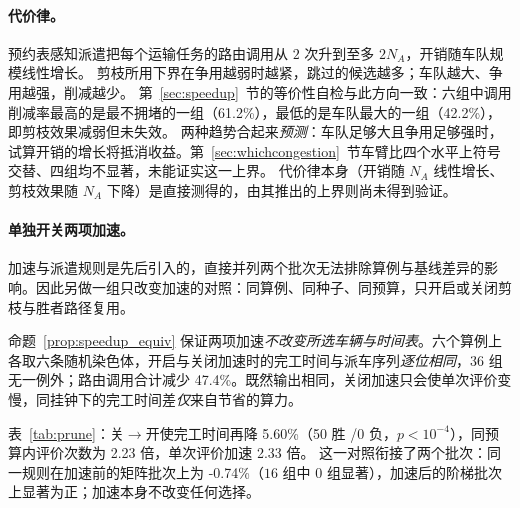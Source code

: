 \documentclass[manuscript,screen,review]{acmart}
\newcommand{\RouteCallCutLo}{42.2\%}     %
\newcommand{\RouteCallCutHi}{61.2\%}     %
\newcommand{\SpeedupProbe}{2.33}
\newcommand{\RouteCallCut}{47.4\%}
\newcommand{\GainPrune}{5.60\%}
\newcommand{\PPrune}{<10^{-4}}
\newcommand{\WinPrune}{50}
\newcommand{\LosePrune}{0}
\newcommand{\EvalRatioPrune}{2.23}
\newcommand{\MatrixCells}{16}
\newcommand{\GainProbePre}{-0.74\%}      %
\begin{document}
\paragraph{代价律。}
预约表感知派遣把每个运输任务的路由调用从 $2$ 次升到至多 $2N_A$，开销随车队规模线性增长。
剪枝所用下界在争用越弱时越紧，跳过的候选越多；车队越大、争用越强，削减越少。
第~\ref{sec:speedup}~节的等价性自检与此方向一致：六组中调用削减率最高的是最不拥堵的一组（\RouteCallCutHi{}），最低的是车队最大的一组（\RouteCallCutLo{}），即剪枝效果减弱但未失效。
两种趋势合起来\emph{预测}：车队足够大且争用足够强时，试算开销的增长将抵消收益。第~\ref{sec:whichcongestion}~节车臂比四个水平上符号交替、四组均不显著，未能证实这一上界。
代价律本身（开销随 $N_A$ 线性增长、剪枝效果随 $N_A$ 下降）是直接测得的，由其推出的上界则尚未得到验证。

\paragraph{单独开关两项加速。}
加速与派遣规则是先后引入的，直接并列两个批次无法排除算例与基线差异的影响。因此另做一组只改变加速的对照：同算例、同种子、同预算，只开启或关闭剪枝与胜者路径复用。

命题~\ref{prop:speedup_equiv} 保证两项加速\emph{不改变所选车辆与时间表}。六个算例上各取六条随机染色体，开启与关闭加速时的完工时间与派车序列\emph{逐位相同}，$36$ 组无一例外；路由调用合计减少 \RouteCallCut{}。既然输出相同，关闭加速只会使单次评价变慢，同挂钟下的完工时间差\emph{仅}来自节省的算力。

表~\ref{tab:prune}：关$\to$开使完工时间再降 \GainPrune{}（\WinPrune{} 胜 /\LosePrune{} 负，$p\PPrune$），同预算内评价次数为 \EvalRatioPrune{} 倍，单次评价加速 \SpeedupProbe{} 倍。
这一对照衔接了两个批次：同一规则在加速前的矩阵批次上为 \GainProbePre{}（$\MatrixCells$ 组中 $0$ 组显著），加速后的阶梯批次上显著为正；加速本身不改变任何选择。

\begin{table}[t]
\caption{只改变剪枝与胜者路径复用。「关」/「开」指二者是否启用，加粗表头为本文采用的设置。
两种设置输出逐位相同（已通过等价性自检），故差值仅来自节省的算力。同算例、同种子、同挂钟；$n=60$ 配对，双侧 Wilcoxon 符号秩检验（$^{***}p<0.001$），合计行并列胜/负/平与 $p$。
两个比值列的分母都是\emph{关}的值，方向相反：评价次数按 开/关，单次评价耗时按 关/开。}
\label{tab:prune}
\small

\end{table}
\end{document}
